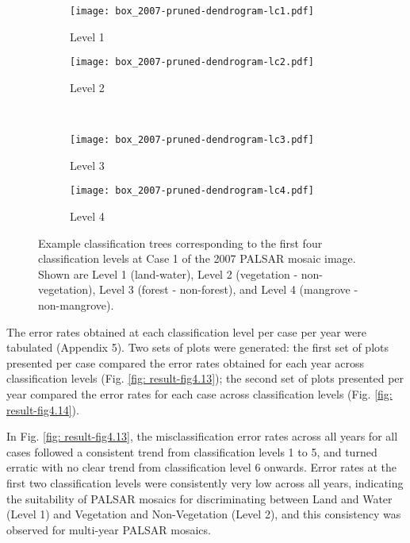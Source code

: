 \begin{figure}[!ht] \centering
	\captionsetup[subfigure]{width=2.0in} %
	\begin{subfigure}[t]{0.49\textwidth}
		\texttt{[image: box\_2007-pruned-dendrogram-lc1.pdf]}
		\caption[Box.4]{Level 1}
		\label{fig: result-fig4.12a}
	\end{subfigure}
	\begin{subfigure}[t]{0.49\textwidth}
		\texttt{[image: box\_2007-pruned-dendrogram-lc2.pdf]}
		\caption[Box.4]{Level 2}
		\label{fig: result-fig4.12b}
	\end{subfigure}\\
	\vspace{15pt}
	\begin{subfigure}[t]{0.49\textwidth}
		\texttt{[image: box\_2007-pruned-dendrogram-lc3.pdf]}
		\caption[Box.4]{Level 3}
		\label{fig: result-fig4.12c}
	\end{subfigure}
	\begin{subfigure}[t]{0.49\textwidth}
		\texttt{[image: box\_2007-pruned-dendrogram-lc4.pdf]}
		\caption[Box.4]{Level 4}
		\label{fig: result-fig4.12d}
	\end{subfigure}
	\vspace{5pt}
	\caption[Box 4. Example classification trees corresponding to the first four classification levels at Case 1 of the 2007 PALSAR mosaic image.]{Example classification trees corresponding to the first four classification levels at Case 1 of the 2007 PALSAR mosaic image. Shown are Level 1 (land-water), Level 2 (vegetation - non-vegetation), Level 3 (forest - non-forest), and Level 4 (mangrove - non-mangrove).}
	\label{fig: result-fig4.12}
\end{figure}

The error rates obtained at each classification level per case per year were tabulated (Appendix 5). Two sets of plots were generated: the first set of plots presented per case compared the error rates obtained for each year across classification levels (Fig. \ref{fig: result-fig4.13}); the second set of plots presented per year compared the error rates for each case across classification levels (Fig. \ref{fig: result-fig4.14}).

In Fig. \ref{fig: result-fig4.13}, the misclassification error rates across all years for all cases followed a consistent trend from classification levels 1 to 5, and turned erratic with no clear trend from classification level 6 onwards. Error rates at the first two classification levels were consistently very low across all years, indicating the suitability of PALSAR mosaics for discriminating between Land and Water (Level 1) and Vegetation and Non-Vegetation (Level 2), and this consistency was observed for multi-year PALSAR mosaics.

